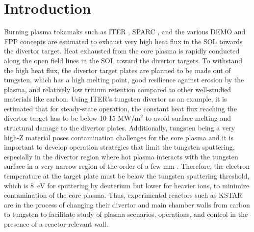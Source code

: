 \section{Introduction}
\label{sec:introduction}

Burning plasma tokamaks such as ITER \cite{Holtkamp_2007_FED}, SPARC \cite{Creely_2020_JPP}, and the various DEMO \cite{Federici_2014_FED} and \ac{FPP} \cite{Buttery_2021_NF} concepts are estimated to exhaust very high heat flux in the \ac{SOL} towards the divertor target.
Heat exhausted from the core plasma is rapidly conducted along the open field lines in the \ac{SOL} toward the divertor targets.
To withstand the high heat flux, the divertor target plates are planned to be made out of tungsten, which has a high melting point, good resilience against erosion by the plasma, and relatively low tritium retention compared to other well-studied materials like carbon.
Using ITER's tungsten divertor as an example, it is estimated that for steady-state operation, the constant heat flux reaching the divertor target has to be below 10-15 MW/m$^2$ \cite{Pitts_2019_NME} to avoid surface melting and structural damage to the divertor plates.
Additionally, tungsten being a very high-Z material poses contamination challenges for the core plasma and it is important to develop operation strategies that limit the tungsten sputtering, especially in the divertor region where hot plasma interacts with the tungsten surface in a very narrow region of the order of a few mm \cite{Eich_2013_NF}.
Therefore, the electron temperature at the target plate must be below the tungsten sputtering threshold, which is 8~eV \cite{Brezinsek_2019_NF} for sputtering by deuterium but lower for heavier ions, to minimize contamination of the core plasma.
Thus, experimental reactors such as KSTAR are in the process of changing their divertor and main chamber walls from carbon to tungsten to facilitate study of plasma scenarios, operations, and control in the presence of a reactor-relevant wall.

